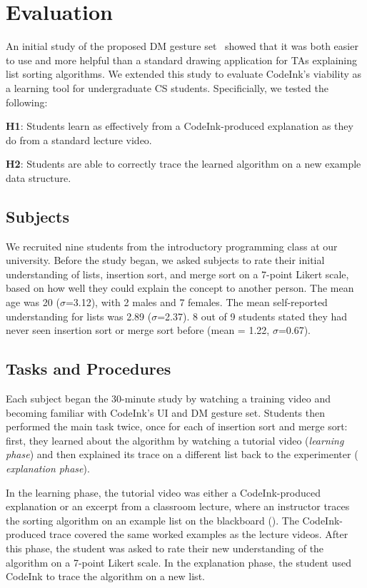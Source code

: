 \newpage
\section{Evaluation}

An initial study of the proposed DM gesture set~\cite{Scott2014} showed that it
was both easier to use and more helpful than a standard drawing application for
TAs explaining list sorting algorithms. We extended this study to evaluate
CodeInk's viability as a learning tool for undergraduate CS students.
Specificially, we tested the following:

\noindent \textbf{H1}: Students learn as effectively from a CodeInk-produced
explanation as they do from a standard lecture video.

\noindent \textbf{H2}: Students are able to correctly trace the learned
algorithm on a new example data structure.

\subsection{Subjects}
We recruited nine students from the introductory programming class at our
university. Before the study began, we asked subjects to rate their initial
understanding of lists, insertion sort, and merge sort on a 7-point Likert
scale, based on how well they could explain the concept to another person. The
mean age was 20 ($\sigma$=3.12), with 2 males and 7 females. The mean
self-reported understanding for lists was 2.89 ($\sigma$=2.37).
8 out of 9 students stated they had never seen insertion sort or merge sort
before (mean = 1.22, $\sigma$=0.67).

\subsection{Tasks and Procedures}
Each subject began the 30-minute study by watching a training video and becoming
familiar with CodeInk's UI and DM gesture set. Students then performed the main
task twice, once for each of insertion sort and merge sort: first, they learned
about the algorithm by watching a tutorial video ({\em learning phase}) and then
explained its trace on a different list back to the experimenter ({\em
explanation phase}).

In the learning phase, the tutorial video was either a CodeInk-produced
explanation or an excerpt from a classroom lecture, where an instructor traces
the sorting algorithm on an example list on the blackboard
(). The CodeInk-produced trace covered the same worked
examples as the lecture videos. After this phase, the student was asked to rate
their new understanding of the algorithm on a 7-point Likert scale. In the
explanation phase, the student used CodeInk to trace the algorithm on a new
list.

